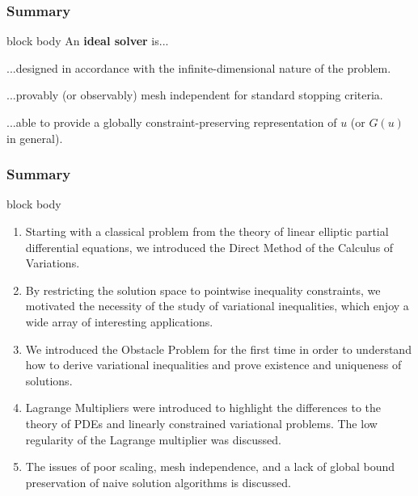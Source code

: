 \documentclass[aspectratio=169,xcolor=dvipsnames,11pt]{beamer}
\begin{document}
 \begin{frame}\frametitle{Summary}
      \begin{beamercolorbox}[rounded=true, shadow=true, wd=\textwidth]{block body}
An \alert{\bf{ideal solver}} is...\medskip

...designed in accordance with the infinite-dimensional nature of the problem.\medskip

...provably (or observably) mesh independent for standard stopping criteria.\medskip

...able to provide a globally constraint-preserving representation of $u$ (or $G(u)$ in general).
 \end{beamercolorbox}
 \hfill
{}
 \end{frame}

\begin{frame}\frametitle{Summary}
\begin{beamercolorbox}[rounded=true, shadow=true, wd=\textwidth]{block body}
\begin{enumerate}
\item Starting with a classical problem from the theory of linear elliptic partial differential equations, we introduced the Direct Method of the Calculus of Variations.
\item By restricting the solution space to pointwise inequality constraints, we motivated the necessity of the study of variational inequalities, which enjoy a wide array of interesting applications.
\item We introduced the Obstacle Problem for the first time in order to understand how to derive variational inequalities and prove existence and uniqueness of solutions.
\item Lagrange Multipliers were introduced to highlight the differences  to the theory of PDEs and linearly constrained variational problems. The low regularity of the Lagrange multiplier was discussed.
\item The issues of poor scaling, mesh independence, and a lack of global bound preservation of naive solution algorithms is discussed.
\end{enumerate}
\end{beamercolorbox}
\end{frame}
\end{document}
